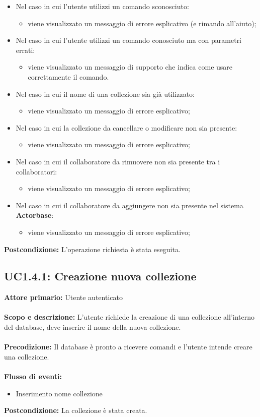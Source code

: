 \documentclass{scalatekids-article}
\begin{document}
\begin{itemize}
\item Nel caso in cui l'utente utilizzi un comando sconosciuto:
  \begin{itemize}
  \item viene visualizzato un messaggio di errore esplicativo (e rimando all'aiuto);
  \end{itemize}
\item Nel caso in cui l'utente utilizzi un comando conosciuto ma con parametri errati:
  \begin{itemize}
  \item viene visualizzato un messaggio di supporto che indica come usare correttamente il comando.
  \end{itemize}
\item Nel caso in cui il nome di una collezione sia già utilizzato:
  \begin{itemize}
  \item viene visualizzato un messaggio di errore esplicativo;
  \end{itemize}
\item Nel caso in cui la collezione da cancellare o modificare non sia presente:
  \begin{itemize}
  \item viene visualizzato un messaggio di errore esplicativo;
  \end{itemize}
\item Nel caso in cui il collaboratore da rimuovere non sia presente tra i collaboratori:
  \begin{itemize}
  \item viene visualizzato un messaggio di errore esplicativo;
  \end{itemize}
\item Nel caso in cui il collaboratore da aggiungere non sia presente nel sistema \textbf{Actorbase}:
  \begin{itemize}
  \item viene visualizzato un messaggio di errore esplicativo;
  \end{itemize}
\end{itemize}
\textbf{Postcondizione:} L'operazione richiesta è stata eseguita.
\subsection{UC1.4.1: Creazione nuova collezione}
\textbf{Attore primario:} Utente autenticato\\ \\
\textbf{Scopo e descrizione:} L'utente richiede la creazione di una collezione all'interno del database, deve inserire il nome della nuova collezione.\\ \\
\textbf{Precodizione:} Il database è pronto a ricevere comandi e l'utente intende creare una collezione.\\ \\
\textbf{Flusso di eventi:}
\begin{itemize}
\item Inserimento nome collezione
\end{itemize}
\textbf{Postcondizione:} La collezione è stata creata.
\end{document}
